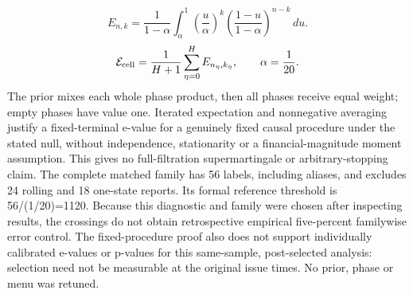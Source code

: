 \documentclass[11pt,a4paper]{article}
\begin{document}
\[
E_{n,k}=\frac{1}{1-\alpha}\int_\alpha^1\left(\frac{u}{\alpha}\right)^k\left(\frac{1-u}{1-\alpha}\right)^{n-k}\,du.
\]
\[
\mathcal E_{\rm cell}=\frac{1}{H+1}\sum_{\eta=0}^{H}E_{n_\eta,k_\eta},\qquad\alpha=\frac1{20}.
\]
The prior mixes each whole phase product, then all phases receive equal weight; empty phases have value one. Iterated expectation and nonnegative averaging justify a fixed-terminal e-value for a genuinely fixed causal procedure under the stated null, without independence, stationarity or a financial-magnitude moment assumption. This gives no full-filtration supermartingale or arbitrary-stopping claim. The complete matched family has 56 labels, including aliases, and excludes 24 rolling and 18 one-state reports. Its formal reference threshold is 56/(1/20)=1120. Because this diagnostic and family were chosen after inspecting results, the crossings do not obtain retrospective empirical five-percent familywise error control. The fixed-procedure proof also does not support individually calibrated e-values or p-values for this same-sample, post-selected analysis: selection need not be measurable at the original issue times. No prior, phase or menu was retuned.
\end{document}
